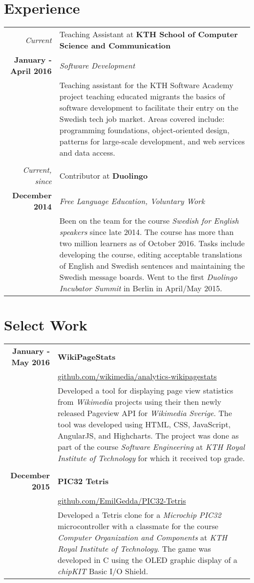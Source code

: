 \documentclass[a4paper,10pt]{article}
\begin{document}
\section{Experience}
\begin{tabular}{r|p{11cm}}
\emph{Current} & Teaching Assistant at \textbf{KTH School of Computer Science and Communication} \\
\textbf{January - April 2016} & \emph{Software Development} \\
& \footnotesize{Teaching assistant for the KTH Software Academy project teaching educated migrants the basics of software development to facilitate their entry on the Swedish tech job market. Areas covered include: programming foundations, object-oriented design, patterns for large-scale development, and web services and data access.} \\ \\

\emph{Current, since} & Contributor at \textbf{Duolingo}\\\textbf{December 2014}&\emph{Free Language Education, Voluntary Work}\\&\footnotesize{Been on the team for the course \emph{Swedish for English speakers} since late 2014. The course has more than two million learners as of October 2016. Tasks include developing the course, editing acceptable translations of English
 and Swedish sentences and maintaining the Swedish message boards. Went to the first \emph{Duolingo Incubator Summit} in Berlin in April/May 2015.}\\ 
\end{tabular}

\section{Select Work}
\begin{tabular}{r|p{11cm}}
\textbf{January - May 2016} & \textbf{WikiPageStats} \\
    & \href{https://github.com/wikimedia/analytics-wikipagestats}{github.com/wikimedia/analytics-wikipagestats} \\
    & \footnotesize{Developed a tool for displaying page view statistics from \emph{Wikimedia} projects using their then newly released Pageview API for \emph{Wikimedia Sverige}. The tool was developed using HTML, CSS, JavaScript, AngularJS, and Highcharts. The project was done as part of the course \emph{Software Engineering} at \emph{KTH Royal Institute of Technology} for which it received top grade.}\\
&\\
\textbf{December 2015} & \textbf{PIC32 Tetris} \\
    & \href{https://github.com/EmilGedda/PIC32-Tetris}{github.com/EmilGedda/PIC32-Tetris} \\
    & \footnotesize{Developed a Tetris clone for a \emph{Microchip PIC32} microcontroller with a classmate for the course \emph{Computer Organization and Components} at \emph{KTH Royal Institute of Technology}. The game was developed in C using the OLED graphic display of a \emph{chipKIT} Basic I/O Shield.}
\end{tabular}
\end{document}
